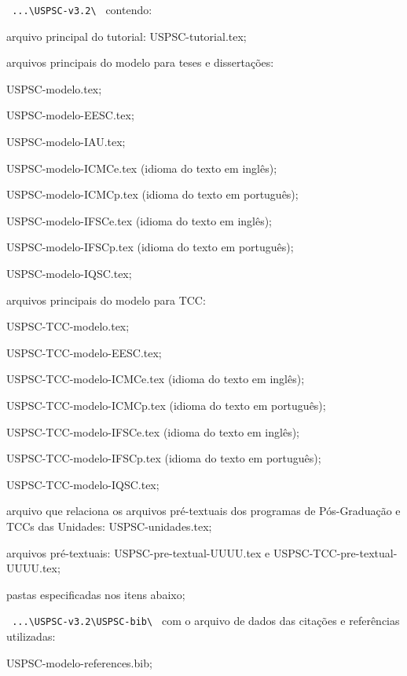 \begin{alineas}	
	\item \verb+ ...\USPSC-v3.2\ + contendo:	
		\begin{alineas}
			\item arquivo principal do tutorial: USPSC-tutorial.tex;
			\item arquivos principais do modelo para teses e dissertações:
				\begin{subalineas}
					\item USPSC-modelo.tex;
					\item USPSC-modelo-EESC.tex;
					\item USPSC-modelo-IAU.tex;
					\item USPSC-modelo-ICMCe.tex (idioma do texto em inglês);
					\item USPSC-modelo-ICMCp.tex (idioma do texto em português);
					\item USPSC-modelo-IFSCe.tex (idioma do texto em inglês);
					\item USPSC-modelo-IFSCp.tex (idioma do texto em português);
					\item USPSC-modelo-IQSC.tex;
				\end{subalineas}
			\item arquivos principais do modelo para TCC: 
			\begin{subalineas}
				\item USPSC-TCC-modelo.tex;
				\item USPSC-TCC-modelo-EESC.tex;
				\item USPSC-TCC-modelo-ICMCe.tex (idioma do texto em inglês);
				\item USPSC-TCC-modelo-ICMCp.tex (idioma do texto em português);
				\item USPSC-TCC-modelo-IFSCe.tex (idioma do texto em inglês);
				\item USPSC-TCC-modelo-IFSCp.tex (idioma do texto em português);
				\item USPSC-TCC-modelo-IQSC.tex;
			\end{subalineas}
			\item arquivo que relaciona os arquivos pré-textuais dos programas de Pós-Graduação e TCCs das Unidades: USPSC-unidades.tex;
			\item arquivos pré-textuais: USPSC-pre-textual-UUUU.tex e USPSC-TCC-pre-textual-UUUU.tex;
			\item pastas especificadas nos itens abaixo;
	   	\end{alineas}
	   	
	\item \verb+ ...\USPSC-v3.2\USPSC-bib\ + com o arquivo de dados das citações e referências utilizadas: 
		\begin{alineas}	
			\item USPSC-modelo-references.bib;
		\end{alineas} 
		

\end{alineas}
